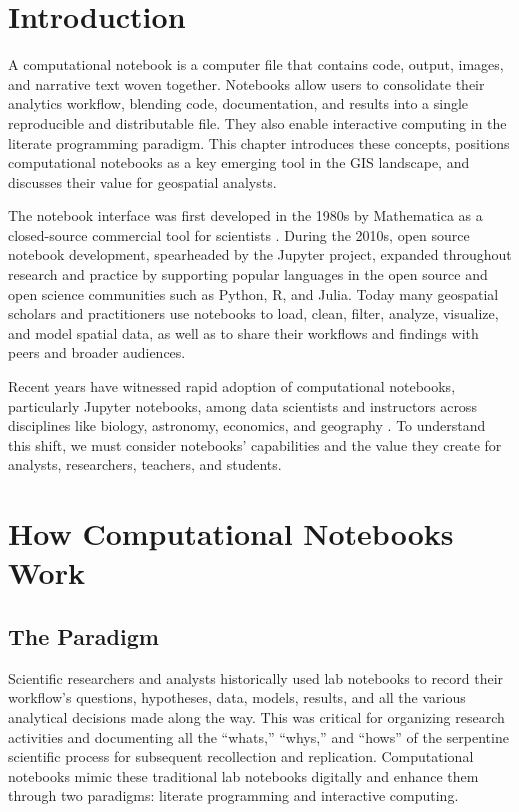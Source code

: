 \documentclass[11pt,letterpaper]{article}
\begin{document}
\section{Introduction}

A computational notebook is a computer file that contains code, output, images, and narrative text woven together. Notebooks allow users to consolidate their analytics workflow, blending code, documentation, and results into a single reproducible and distributable file. They also enable interactive computing in the literate programming paradigm. This chapter introduces these concepts, positions computational notebooks as a key emerging tool in the GIS landscape, and discusses their value for geospatial analysts.

The notebook interface was first developed in the 1980s by Mathematica as a closed-source commercial tool for scientists \citep{somers_scientific_2018}. During the 2010s, open source notebook development, spearheaded by the Jupyter project, expanded throughout research and practice by supporting popular languages in the open source and open science communities such as Python, R, and Julia. Today many geospatial scholars and practitioners use notebooks to load, clean, filter, analyze, visualize, and model spatial data, as well as to share their workflows and findings with peers and broader audiences.

Recent years have witnessed rapid adoption of computational notebooks, particularly Jupyter notebooks, among data scientists and instructors across disciplines like biology, astronomy, economics, and geography \citep{perkel_why_2018}. To understand this shift, we must consider notebooks' capabilities and the value they create for analysts, researchers, teachers, and students.

\section{How Computational Notebooks Work}

\subsection{The Paradigm}

Scientific researchers and analysts historically used lab notebooks to record their workflow's questions, hypotheses, data, models, results, and all the various analytical decisions made along the way. This was critical for organizing research activities and documenting all the \enquote{whats,} \enquote{whys,} and \enquote{hows} of the serpentine scientific process for subsequent recollection and replication. Computational notebooks mimic these traditional lab notebooks digitally and enhance them through two paradigms: literate programming and interactive computing.
\end{document}
